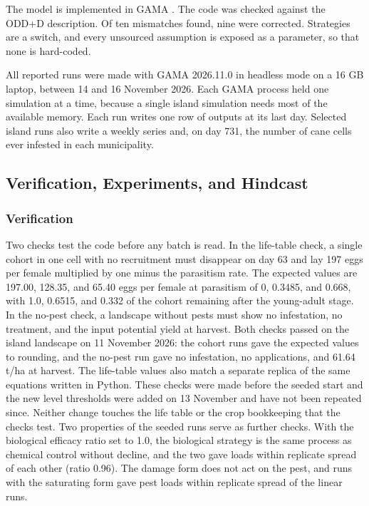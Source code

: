 The model is implemented in GAMA \citep{Taillandier2019}. The code was checked against the ODD+D description. Of ten mismatches found, nine were corrected. Strategies are a switch, and every unsourced assumption is exposed as a parameter, so that none is hard-coded.

All reported runs were made with GAMA 2026.11.0 in headless mode on a 16 GB laptop, between 14 and 16 November 2026. Each GAMA process held one simulation at a time, because a single island simulation needs most of the available memory. Each run writes one row of outputs at its last day. Selected island runs also write a weekly series and, on day 731, the number of cane cells ever infested in each municipality.

\subsection{Verification, Experiments, and Hindcast}

\subsubsection{Verification}

Two checks test the code before any batch is read. In the life-table check, a single cohort in one cell with no recruitment must disappear on day 63 and lay 197 eggs per female multiplied by one minus the parasitism rate. The expected values are 197.00, 128.35, and 65.40 eggs per female at parasitism of 0, 0.3485, and 0.668, with 1.0, 0.6515, and 0.332 of the cohort remaining after the young-adult stage. In the no-pest check, a landscape without pests must show no infestation, no treatment, and the input potential yield at harvest. Both checks passed on the island landscape on 11 November 2026: the cohort runs gave the expected values to rounding, and the no-pest run gave no infestation, no applications, and 61.64 t/ha at harvest. The life-table values also match a separate replica of the same equations written in Python. These checks were made before the seeded start and the new level thresholds were added on 13 November and have not been repeated since. Neither change touches the life table or the crop bookkeeping that the checks test. Two properties of the seeded runs serve as further checks. With the biological efficacy ratio set to 1.0, the biological strategy is the same process as chemical control without decline, and the two gave loads within replicate spread of each other (ratio 0.96). The damage form does not act on the pest, and runs with the saturating form gave pest loads within replicate spread of the linear runs.

